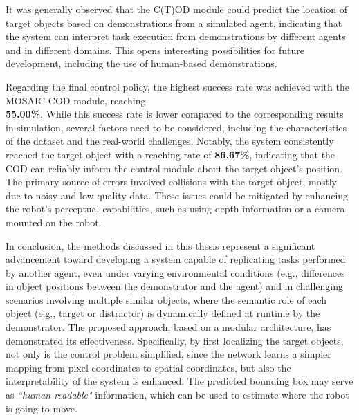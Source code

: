 It was generally observed that the C(T)OD module could predict the location of target objects based on demonstrations from a simulated agent, indicating that the system can interpret task execution from demonstrations by different agents and in different domains. This opens interesting possibilities for future development, including the use of human-based demonstrations.

Regarding the final control policy, the highest success rate was achieved with the MOSAIC-COD module, reaching \\ \textbf{55.00\%}. While this success rate is lower compared to the corresponding results in simulation, several factors need to be considered, including the characteristics of the dataset and the real-world challenges. Notably, the system consistently reached the target object with a reaching rate of \textbf{86.67\%}, indicating that the COD can reliably inform the control module about the target object's position. The primary source of errors involved collisions with the target object, mostly due to noisy and low-quality data. These issues could be mitigated by enhancing the robot's perceptual capabilities, such as using depth information or a camera mounted on the robot.


In conclusion, the methods discussed in this thesis represent a significant advancement toward developing a system capable of replicating tasks performed by another agent, even under varying environmental conditions (e.g., differences in object positions between the demonstrator and the agent) and in challenging scenarios involving multiple similar objects, where the semantic role of each object (e.g., target or distractor) is dynamically defined at runtime by the demonstrator. The proposed approach, based on a modular architecture, has demonstrated its effectiveness. Specifically, by first localizing the target objects, not only is the control problem simplified, since the network learns a simpler mapping from pixel coordinates to spatial coordinates, but also the interpretability of the system is enhanced. The predicted bounding box may serve as \textit{``human-readable"} information, which can be used to estimate where the robot is going to move.

